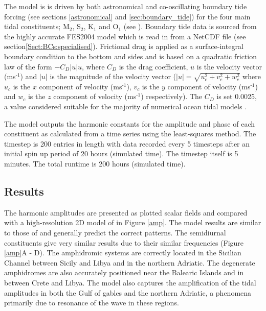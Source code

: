 The model is is driven by both astronomical and co-oscillating boundary tide forcing (see sections \ref{astronomical} and \ref{sec:boundary_tide})
for the four main tidal constituents; M$_{\text{2}}$, S$_{\text{2}}$, K$_{\text{1}}$ and O$_{\text{1}}$ (see \citealp{Schwiderski1980,Wells2008}).
Boundary tide data is sourced from the highly accurate FES2004 model \citep{Lyard2006} which is read in from a NetCDF file (see section\ref{Sect:BCs:specialised}). 
Frictional drag is applied as a surface-integral boundary condition to the bottom and sides and is based on a quadratic friction law 
of the form $-C_{D}|u|u$, where $C_{D}$ is the drag coefficient, $u$ is the velocity vector 
(ms$^{\text{-1}}$) and $|u|$ is the magnitude of the velocity vector ($|u|=\sqrt{u_{c}^{2}+v_{c}^{2}+w_{c}^{2}}$ where $u_{c}$ is the $x$ component of 
velocity (ms$^{\text{-1}}$), 
$v_{c}$ is the $y$ component of velocity (ms$^{\text{-1}}$) and $w_{c}$ is the 
$z$ component of velocity (ms$^{\text{-1}}$) respectively). 
The $C_{D}$ is set 0.0025, a value considered suitable for the majority of numerical ocean tidal models \citep{Wells2008}. 

The model outputs the harmonic constants for the amplitude and phase of each constituent as calculated from a time series using the least-squares
method. The timestep is 200 entries in length with data recorded every 5 timesteps after an initial spin up period of 20 hours (simulated time). 
The timestep itself is 5 minutes. The total runtime is 200 hours (simulated time).


\subsection{Results}

The harmonic amplitudes are presented as plotted scalar fields and compared with a high-resolution 2D model of \citet{Tsimplis1995} in
Figure \ref{amp}. The model results are similar to those of \citet{Tsimplis1995} and generally predict the correct patterns. 
The semidiurnal constituents give very similar results due to their similar frequencies (Figure \ref{amp}A - D). The amphidromic
systems are correctly located in the Sicilian Channel between Sicily and Libya     
and in the northern Adriatic. The degenerate amphidromes are also accurately positioned near the Balearic Islands and in between
Crete and Libya. The model also captures the amplification of the tidal amplitudes in both the Gulf of gables and the northern Adriatic, 
a phenomena primarily due to resonance of the wave in these regions.

